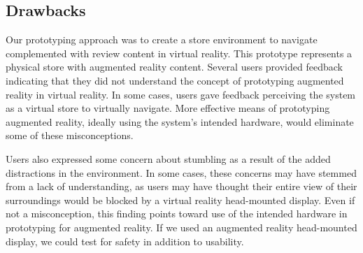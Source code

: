 \documentclass{sigchi-ext}
\begin{document}
\subsection{Drawbacks}
Our prototyping approach was to create a store environment to navigate complemented with review content in virtual reality.  This prototype represents a physical store with augmented reality content.  Several users provided feedback indicating that they did not understand the concept of prototyping augmented reality in virtual reality.  In some cases, users gave feedback perceiving the system as a virtual store to virtually navigate.  More effective means of prototyping augmented reality, ideally using the system's intended hardware, would eliminate some of these misconceptions.

Users also expressed some concern about stumbling as a result of the added distractions in the environment.  In some cases, these concerns may have stemmed from a lack of understanding, as users may have thought their entire view of their surroundings would be blocked by a virtual reality head-mounted display.  Even if not a misconception, this finding points toward use of the intended hardware in prototyping for augmented reality.  If we used an augmented reality head-mounted display, we could test for safety in addition to usability.
\end{document}
